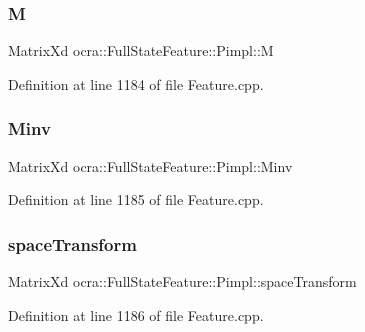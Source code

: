 \hypertarget{structocra_1_1FullStateFeature_1_1Pimpl_ae2b1ab14e57380beb59d953ab4e72045}{}\label{structocra_1_1FullStateFeature_1_1Pimpl_ae2b1ab14e57380beb59d953ab4e72045} 
\subsubsection{\texorpdfstring{M}{M}}
{\footnotesize\ttfamily Matrix\+Xd ocra\+::\+Full\+State\+Feature\+::\+Pimpl\+::M}



Definition at line 1184 of file Feature.\+cpp.

\hypertarget{structocra_1_1FullStateFeature_1_1Pimpl_add9febc56f82bdd70913af436e2a32ef}{}\label{structocra_1_1FullStateFeature_1_1Pimpl_add9febc56f82bdd70913af436e2a32ef} 
\subsubsection{\texorpdfstring{Minv}{Minv}}
{\footnotesize\ttfamily Matrix\+Xd ocra\+::\+Full\+State\+Feature\+::\+Pimpl\+::\+Minv}



Definition at line 1185 of file Feature.\+cpp.

\hypertarget{structocra_1_1FullStateFeature_1_1Pimpl_a365838ffac9d0f8710c86493f04aa084}{}\label{structocra_1_1FullStateFeature_1_1Pimpl_a365838ffac9d0f8710c86493f04aa084} 
\subsubsection{\texorpdfstring{space\+Transform}{spaceTransform}}
{\footnotesize\ttfamily Matrix\+Xd ocra\+::\+Full\+State\+Feature\+::\+Pimpl\+::space\+Transform}



Definition at line 1186 of file Feature.\+cpp.

\hypertarget{structocra_1_1FullStateFeature_1_1Pimpl_a4561279776ecf9adda446067000e3536}{}\label{structocra_1_1FullStateFeature_1_1Pimpl_a4561279776ecf9adda446067000e3536} 
